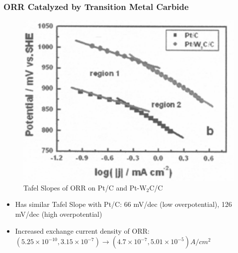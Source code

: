 \documentclass{beamer}
\begin{document}
\begin{frame}
\frametitle{ORR Catalyzed by Transition Metal Carbide}
\begin{figure}[htbp]
    \begin{center}
    \includegraphics[scale = 0.5]{image228}
    \caption{Tafel Slopes of ORR on Pt/C and Pt-W$_2$C/C}
    \end{center}
\end{figure}
\begin{itemize}
\item{Has similar Tafel Slope with Pt/C: 66 mV/dec (low overpotential), 126 mV/dec (high overpotential)}
\item{Increased exchange current density of ORR: \newline
$(5.25 \times 10^{-10}, 3.15 \times 10^{-7}) \longrightarrow (4.7 \times 10^{-7}, 5.01 \times 10^{-5}) A/cm^2$}
\end{itemize}
\end{frame}
\end{document}

